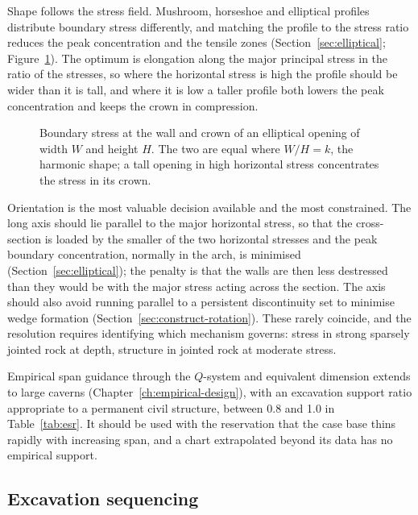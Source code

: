 Shape follows the stress field. Mushroom, horseshoe and elliptical profiles
distribute boundary stress differently, and matching the profile to the stress
ratio reduces the peak concentration and the tensile zones
(Section~\ref{sec:elliptical}; Figure~\ref{fig:elliptical-stress}). The optimum is
elongation along the major principal stress in the ratio of the stresses, so
where the horizontal stress is high the profile should be wider than it is
tall, and where it is low a taller profile both lowers the peak concentration
and keeps the crown in compression.

\begin{figure}[htbp]
\centering
{}
\caption{Boundary stress at the wall and crown of an elliptical opening of width $W$ and height $H$. The two are equal where $W/H = k$, the harmonic shape; a tall opening in high horizontal stress concentrates the stress in its crown.}
\label{fig:elliptical-stress}
\end{figure}

Orientation is the most valuable decision available and the most constrained.
The long axis should lie parallel to the major horizontal stress, so that the
cross-section is loaded by the smaller of the two horizontal stresses and the
peak boundary concentration, normally in the arch, is minimised
(Section~\ref{sec:elliptical}); the penalty is that the walls are then less
destressed than they would be with the major stress acting across the
section. The axis should also avoid running parallel to a
persistent discontinuity set to minimise wedge formation (Section~\ref{sec:construct-rotation}). These rarely
coincide, and the resolution requires identifying which mechanism governs:
stress in strong sparsely jointed rock at depth, structure in jointed rock
at moderate stress.

Empirical span guidance through the $Q$-system and equivalent dimension
extends to large caverns (Chapter~\ref{ch:empirical-design}), with an
excavation support ratio appropriate to a permanent civil structure, between
0.8 and 1.0 in Table~\ref{tab:esr}. It should be used with the reservation that the
case base thins rapidly with increasing span, and a chart extrapolated beyond
its data has no empirical support.

\subsection{Excavation sequencing}
\label{sec:cavern-sequencing}


